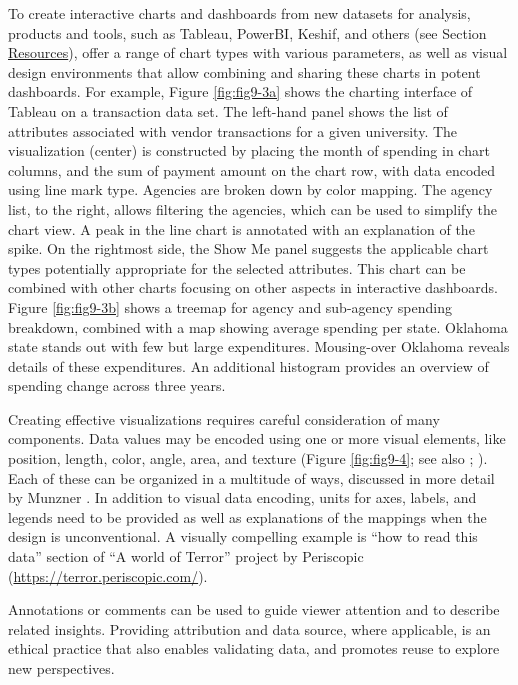 \documentclass[]{krantz}
\begin{document}
To create interactive charts and dashboards from new datasets for
analysis, products and tools, such as Tableau, PowerBI, Keshif, and
others (see Section \protect\hyperlink{sec:viz-6}{Resources}), offer a
range of chart types with various parameters, as well as visual design
environments that allow combining and sharing these charts in potent
dashboards. For example, Figure \ref{fig:fig9-3a} shows the charting
interface of Tableau on a transaction data set. The left-hand panel
shows the list of attributes associated with vendor transactions for a
given university. The visualization (center) is constructed by placing
the month of spending in chart columns, and the sum of payment amount on
the chart row, with data encoded using line mark type. Agencies are
broken down by color mapping. The agency list, to the right, allows
filtering the agencies, which can be used to simplify the chart view. A
peak in the line chart is annotated with an explanation of the spike. On
the rightmost side, the Show Me panel suggests the applicable chart
types potentially appropriate for the selected attributes. This chart
can be combined with other charts focusing on other aspects in
interactive dashboards. Figure \ref{fig:fig9-3b} shows a treemap
\citep{johnson1991tree} for agency and sub-agency spending breakdown,
combined with a map showing average spending per state. Oklahoma state
stands out with few but large expenditures. Mousing-over Oklahoma
reveals details of these expenditures. An additional histogram provides
an overview of spending change across three years.

Creating effective visualizations requires careful consideration of many
components. Data values may be encoded using one or more visual
elements, like position, length, color, angle, area, and texture (Figure
\ref{fig:fig9-4}; see also \citet{cleveland1984graphical};
\citet{edward2001visual}). Each of these can be organized in a multitude
of ways, discussed in more detail by Munzner
\citeyearpar{munzner2014visualization}. In addition to visual data
encoding, units for axes, labels, and legends need to be provided as
well as explanations of the mappings when the design is unconventional.
A visually compelling example is ``how to read this data'' section of
``A world of Terror'' project by Periscopic
(\url{https://terror.periscopic.com/}).

Annotations or comments can be used to guide viewer attention and to
describe related insights. Providing attribution and data source, where
applicable, is an ethical practice that also enables validating data,
and promotes reuse to explore new perspectives.
\end{document}
